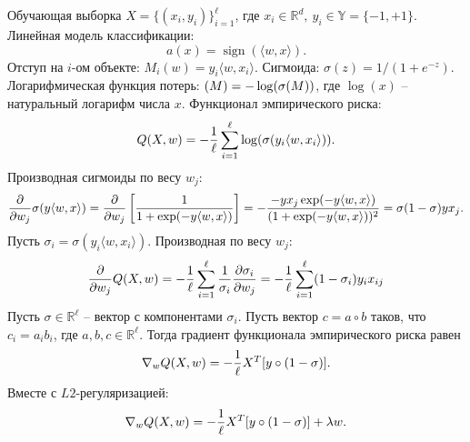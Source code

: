 \documentclass[12pt]{extarticle}
\newcommand{\R}{\mathbb{R}}
\let\L\relax
\newcommand{\L}{\mathcal{L}}
\DeclareMathOperator{\sign}{\text{sign}}
\begin{document}
Обучающая выборка $X=\{(x_i,y_i)\}_{i=1}^\ell$, где $x_i\in\R^d,\ y_i\in\mathbb{Y}=\{-1,+1\}$. Линейная модель классификации:
\begin{equation*}
    a(x)=\sign(\langle w,x\rangle).
\end{equation*}
Отступ на $i$-ом объекте: $M_i(w)=y_i\langle w,x_i\rangle$. Сигмоида: $\sigma(z)=1/(1+e^{-z})$. Логарифмическая функция потерь: $\L(M)=-\log(\sigma(M))$, где $\log(x)$ -- натуральный логарифм числа $x$. Функционал эмпирического риска:
\begin{equation*}
    Q(X, w)=-{1\over \ell}\sum_{i=1}^\ell\log(\sigma(y_i\langle w, x_i\rangle)).
\end{equation*}
Производная сигмоиды по весу $w_j$:
\begin{equation*}
    {\partial\over\partial w_j}\sigma(y\langle w, x\rangle)={\partial\over\partial w_j}\left[{1\over1+\exp(-y\langle w, x\rangle)}\right]=-{-yx_j\exp(-y\langle w, x\rangle)\over(1+\exp(-y\langle w, x\rangle))^2}=\sigma(1-\sigma)yx_j.
\end{equation*}
Пусть $\sigma_i=\sigma(y_i\langle w, x_i\rangle)$. Производная по весу $w_j$:
\begin{equation*}
    {\partial\over\partial w_j}Q(X, w)=-{1\over\ell}\sum_{i=1}^\ell{1\over\sigma_i}{\partial\sigma_i\over\partial w_j}=-{1\over\ell}\sum_{i=1}^\ell(1-\sigma_i)y_ix_{ij}
\end{equation*}
Пусть $\sigma\in\R^\ell$ -- вектор с компонентами $\sigma_i$. Пусть вектор $c=a\circ b$ таков, что $c_i=a_ib_i$, где $a,b,c\in\R^\ell$. Тогда градиент функционала эмпирического риска равен
\begin{equation*}
    \nabla_w Q(X, w)=-{1\over \ell}X^T[y\circ(1-\sigma)].
\end{equation*}
Вместе с $L2$-регуляризацией:
\begin{equation}\label{eq:lograd}
    \nabla_w Q(X, w)=-{1\over \ell}X^T[y\circ(1-\sigma)]+\lambda w.
\end{equation}
\end{document}
